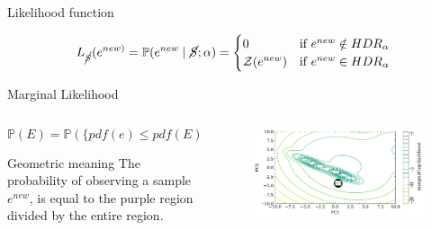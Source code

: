 \documentclass[t]{beamer}
\newcommand{\prob}{\mathbb{P}}
\theoremstyle{definition}
\begin{document}
\begin{frame}{Likelihood function}
    \begin{definition}
        \begin{equation*}
        \label{eq:c3bsle:likelihood}
        L_{\cancel{S}}(e^{new)} = 
        \prob(e^{new} \mid \cancel{S} ; \alpha) = \begin{cases}0 &\text{if $e^{new} \notin HDR_\alpha$} \\
        \mathcal{Z}(e^{new}) &\text{if $e^{new} \in HDR_\alpha$}
        
        \end{cases}
        \end{equation*}
    \end{definition}
    
\end{frame}

\begin{frame}{Marginal Likelihood}

    \begin{columns}[T] %
    
    \begin{column}{0.55\textwidth} %

    \begin{definition}
    \begin{equation*}
    \label{eq:c3bsle:evidence}
    \prob(E) = \prob(\{pdf(e) \leq pdf(E)\})
    \end{equation*}
    \end{definition}
    
    \begin{block}{Geometric meaning}
        The probability of observing a sample $e^{new}$, is equal to the purple region divided by the entire region. 
    \end{block}
    
    \end{column}
    
    \begin{column}{0.45\textwidth} %
    \begin{figure}
        \includegraphics[width=\textwidth]{figs/de_pc1_pc2_likelihood_e_new.pdf}
    \end{figure}


\end{column}
\end{columns}
\end{frame}
\end{document}
